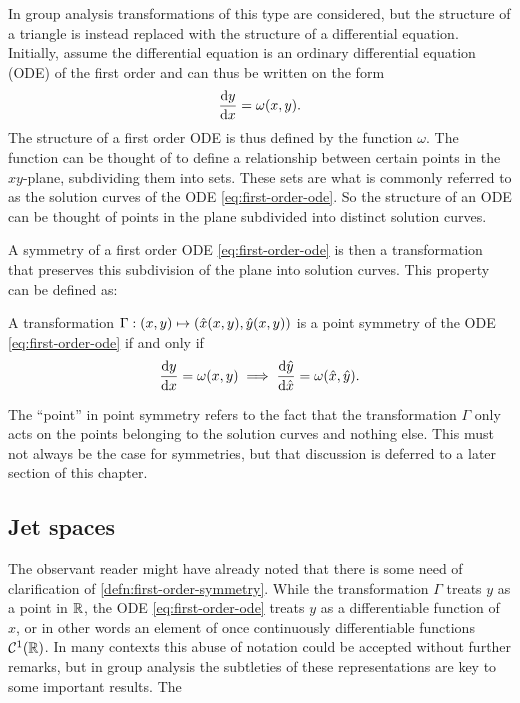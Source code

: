 In group analysis transformations of this type are considered, but the structure of a triangle is instead replaced with the structure of a differential equation.
Initially, assume the differential equation is an ordinary differential equation (ODE) of the first order and can thus be written on the form
\begin{equation} \label{eq:first-order-ode}
  \dv{y}{x} = \omega(x,y).
\end{equation}
The structure of a first order ODE is thus defined by the function \(\omega\).
The function can be thought of to define a relationship between certain points in the \(xy\)-plane, subdividing them into sets.
These sets are what is commonly referred to as the solution curves of the ODE \ref{eq:first-order-ode}.
So the structure of an ODE can be thought of points in the plane subdivided into distinct solution curves.

A symmetry of a first order ODE \ref{eq:first-order-ode} is then a transformation that preserves this subdivision of the plane into solution curves.
This property can be defined as:
\begin{defn} \label{defn:first-order-symmetry}
  A transformation \(\Gamma: \pqty{x,y} \mapsto \pqty{\hat{x}(x,y), \hat{y}(x,y)}\) is a point symmetry of the ODE \ref{eq:first-order-ode} if and only if
  \begin{equation}
    \dv{y}{x} = \omega(x,y)
    \implies
    \dv{\hat{y}}{\hat{x}} = \omega(\hat{x},\hat{y}).
  \end{equation}
\end{defn}
The \enquote{point} in point symmetry refers to the fact that the transformation \(\Gamma\) only acts on the points belonging to the solution curves and nothing else.
This must not always be the case for symmetries, but that discussion is deferred to a later section of this chapter. %

\subsection{Jet spaces}

The observant reader might have already noted that there is some need of clarification of \cref{defn:first-order-symmetry}.
While the transformation \(\Gamma\) treats \(y\) as a point in \(\mathbb{R}\), the ODE \ref{eq:first-order-ode} treats \(y\) as a differentiable function of \(x\), or in other words an element of once continuously differentiable functions \(\mathcal{C}^1(\mathbb{R})\).
In many contexts this abuse of notation could be accepted without further remarks, but in group analysis the subtleties of these representations are key to some important results.
The 

